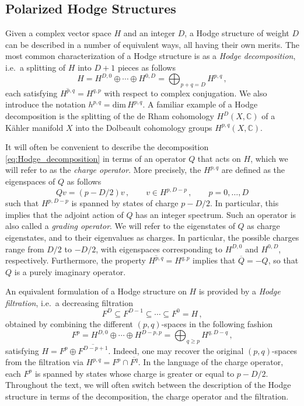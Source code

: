 \documentclass[11pt,a4paper]{article}
\numberwithin{equation}{section}
\numberwithin{table}{section}\setlength{\multlinegap}{25pt}
\begin{document}
\subsection{Polarized Hodge Structures}
\label{subsec:HS}

Given a complex vector space $H$ and an integer $D$, a Hodge structure of weight $D$ can be described in a number of equivalent ways, all having their own merits.
The most common characterization of a Hodge structure is as a \textit{Hodge decomposition}, i.e.~a splitting of $H$ into $D+1$ pieces as follows
\begin{equation}
\label{eq:Hodge_decomposition}	H = H^{D,0}\oplus \cdots \oplus H^{0,D} = \bigoplus_{p+q=D} H^{p,q}\,,
\end{equation}
each satisfying $\overline{H^{p,q}} = H^{q,p}$ with respect to complex conjugation. We also introduce the notation $h^{p,q}=\mathrm{dim}\,H^{p,q}$. A familiar example of a Hodge decomposition is the splitting of the de Rham cohomology $H^D(X,\mathbb{C})$ of a K\"ahler manifold $X$ into the Dolbeault cohomology groups $H^{p,q}(X,\mathbb{C})$.

It will often be convenient to describe the decomposition \eqref{eq:Hodge_decomposition} in terms of an operator $Q$ that acts on $H$, which we will refer to as the \textit{charge operator}. More precisely, the $H^{p,q}$ are defined as the eigenspaces of $Q$ as follows
\begin{equation}
	Qv= (p-D/2)v\,,\qquad v\in H^{p,D-p}\,,\qquad p=0,\ldots,D
\end{equation}
such that $H^{p,D-p}$ is spanned by states of charge $p-D/2$. In particular, this implies that the adjoint action of $Q$ has an integer spectrum. Such an operator is also called a \textit{grading operator}. We will refer to the eigenstates of $Q$ as charge eigenstates, and to their eigenvalues as charges. In particular, the possible charges range from $D/2$ to $-D/2$, with eigenspaces corresponding to $H^{D,0}$ and $H^{0,D}$, respectively. Furthermore, the property $\overline{H^{p,q}} = H^{q,p}$ implies that $\overline{Q} = -Q$, so that $Q$ is a purely imaginary operator.

An equivalent formulation of a Hodge structure on $H$ is provided by a \textit{Hodge filtration}, i.e.~a decreasing filtration
\begin{equation}
	F^D\subseteq F^{D-1}\subseteq \cdots \subseteq F^0 = H\,,
\end{equation}
obtained by combining the different $(p,q)$-spaces in the following fashion
\begin{equation}
	F^p = H^{D,0}\oplus \cdots \oplus H^{D-p,p} = \bigoplus_{q\geq p} H^{q,D-q}\,,
\end{equation}
satisfying $H = F^p\oplus \overline{F^{D-p+1}}$. Indeed, one may recover the original $(p,q)$-spaces from the filtration via $H^{p,q}=F^p\cap \overline{F^q}$. In the language of the charge operator, each $F^p$ is spanned by states whose charge is greater or equal to $p-D/2$. Throughout the text, we will often switch between the description of the Hodge structure in terms of the decomposition, the charge operator and the filtration. 
\end{document}
